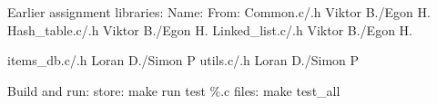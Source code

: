 Earlier assignment libraries\+: Name\+: From\+: Common.\+c/.h Viktor B./\+Egon H. Hash\+\_\+table.\+c/.h Viktor B./\+Egon H. Linked\+\_\+list.\+c/.h Viktor B./\+Egon H.

items\+\_\+db.\+c/.h Loran D./\+Simon P utils.\+c/.h Loran D./\+Simon P

Build and run\+: store\+: make run test \%.c files\+: make test\+\_\+all 